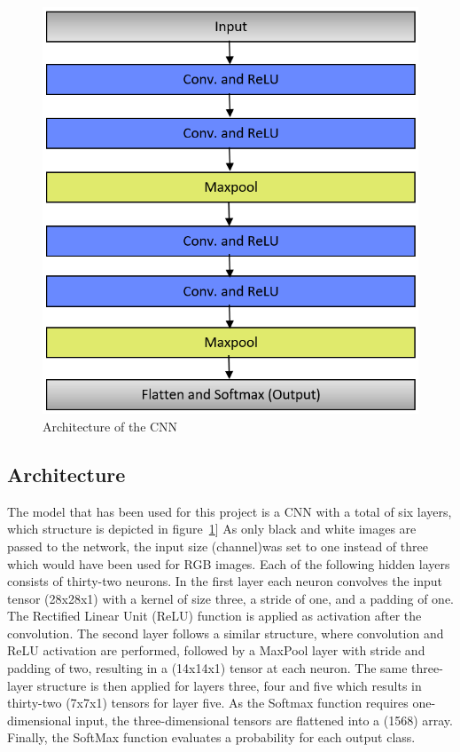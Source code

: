 \documentclass[@CLASSOPTIONS@]{tumarticle}
\begin{document}
\begin{figure}
    \begin{minipage}{0.48\textwidth}
     \centering
     \includegraphics[width=.9\linewidth]{figures/CNN_Arch_5}
     \caption{Architecture of the CNN}\label{Fig:CNN_A}
   \end{minipage}
\end{figure}

\subsection{Architecture}

The model that has been used for this project is a CNN with a total of six layers, which structure is depicted in
figure~\ref{Fig:CNN_A}]
As only black and white images are passed to the network, the input size (channel)was set to one instead of three which
would have been used for RGB images.
Each of the following hidden layers consists of thirty-two neurons.
In the first layer each neuron convolves the input tensor (28x28x1) with a kernel of size three, a stride of one, and
a padding of one.
The Rectified Linear Unit (ReLU) function is applied as activation after the convolution.
The second layer follows a similar structure, where convolution and ReLU activation are performed, followed by a MaxPool
layer with stride and padding of two, resulting in a (14x14x1) tensor at each neuron.
The same three-layer structure is then applied for layers three, four and five which results in thirty-two (7x7x1) tensors for
layer five.
As the Softmax function requires one-dimensional input, the three-dimensional tensors are flattened into a (1568) array.
Finally, the SoftMax function evaluates a probability for each output class.
\end{document}
